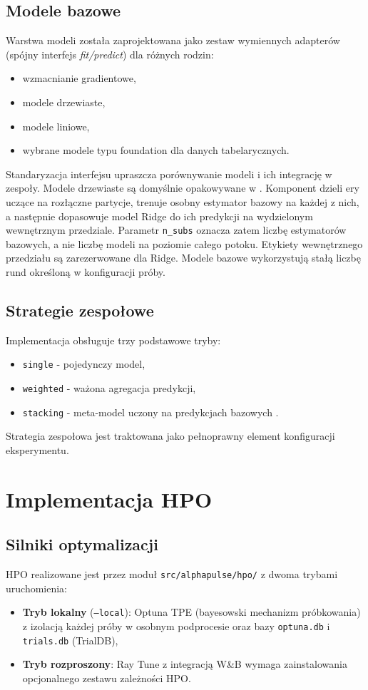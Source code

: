 \documentclass[12pt,a4paper]{report}
\newcommand{\sourcecite}[1]{\autocite{#1}}
\begin{document}
\subsection{Modele bazowe}
Warstwa modeli została zaprojektowana jako zestaw wymiennych adapterów
(spójny interfejs \textit{fit/predict}) dla różnych rodzin:
\begin{itemize}\item wzmacnianie gradientowe,
\item modele drzewiaste,
\item modele liniowe,
\item wybrane modele typu foundation dla danych tabelarycznych.\end{itemize}

Standaryzacja interfejsu upraszcza porównywanie modeli i ich integrację w zespoły.
Modele drzewiaste są domyślnie opakowywane w . Komponent
dzieli ery uczące na rozłączne partycje, trenuje osobny estymator bazowy na każdej
z nich, a następnie dopasowuje model Ridge do ich predykcji na wydzielonym
wewnętrznym przedziale. Parametr \texttt{n\_subs} oznacza zatem liczbę estymatorów
bazowych, a nie liczbę modeli na poziomie całego potoku. Etykiety wewnętrznego
przedziału są zarezerwowane dla Ridge. Modele bazowe wykorzystują stałą liczbę
rund określoną w konfiguracji próby.

\subsection{Strategie zespołowe}
Implementacja obsługuje trzy podstawowe tryby:
\begin{itemize}\item \texttt{single} - pojedynczy model,
\item \texttt{weighted} - ważona agregacja predykcji,
\item \texttt{stacking} - meta-model uczony na predykcjach bazowych
    \sourcecite{stacking}.\end{itemize}

Strategia zespołowa jest traktowana jako pełnoprawny element konfiguracji eksperymentu.

\section{Implementacja HPO}
\subsection{Silniki optymalizacji}
HPO realizowane jest przez moduł \texttt{src/alphapulse/hpo/} z dwoma trybami uruchomienia:
\begin{itemize}\item \textbf{Tryb lokalny} (\texttt{--local}): Optuna TPE \sourcecite{optuna}
    (bayesowski mechanizm próbkowania) z izolacją
    każdej próby w osobnym podprocesie oraz bazy \texttt{optuna.db} i \texttt{trials.db} (TrialDB),
\item \textbf{Tryb rozproszony}: Ray Tune \sourcecite{ray} z integracją W\&B
    wymaga zainstalowania opcjonalnego zestawu zależności HPO.\end{itemize}
\end{document}
